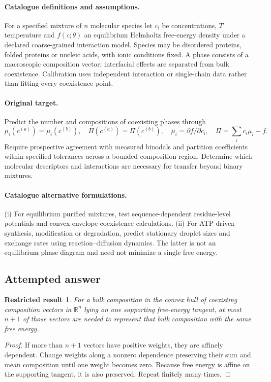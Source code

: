 \documentclass[11pt]{article}
\newcommand{\R}{\mathbb R}
\providecommand{\R}{\mathbb R}
\newtheorem{attemptresult}{Restricted result}[section]
\begin{document}
\paragraph{Catalogue definitions and assumptions.}
For a specified mixture of $n$ molecular species let $c_i$ be concentrations, $T$ temperature and $f(c;\theta)$ an equilibrium Helmholtz free-energy density under a declared coarse-grained interaction model. Species may be disordered proteins, folded proteins or nucleic acids, with ionic conditions fixed. A phase consists of a macroscopic composition vector; interfacial effects are separated from bulk coexistence. Calibration uses independent interaction or single-chain data rather than fitting every coexistence point.
\paragraph{Original target.}
Predict the number and compositions of coexisting phases through
\[\mu_i(c^{(a)})=\mu_i(c^{(b)}),\quad \Pi(c^{(a)})=\Pi(c^{(b)}),\quad \mu_i=\partial f/\partial c_i,\quad \Pi=\sum_i c_i\mu_i-f.\]
Require prospective agreement with measured binodals and partition coefficients within specified tolerances across a bounded composition region. Determine which molecular descriptors and interactions are necessary for transfer beyond binary mixtures.
\paragraph{Catalogue alternative formulations.}
(i) For equilibrium purified mixtures, test sequence-dependent residue-level potentials and convex-envelope coexistence calculations. (ii) For ATP-driven synthesis, modification or degradation, predict stationary droplet sizes and exchange rates using reaction--diffusion dynamics. The latter is not an equilibrium phase diagram and need not minimize a single free energy.
\subsection{Attempted answer}
\begin{attemptresult}
For a bulk composition in the convex hull of coexisting composition vectors in $\R^n$ lying on one supporting free-energy tangent, at most $n+1$ of those vectors are needed to represent that bulk composition with the same free energy.
\end{attemptresult}
\begin{proof}
If more than $n+1$ vectors have positive weights, they are affinely dependent. Change weights along a nonzero dependence preserving their sum and mean composition until one weight becomes zero. Because free energy is affine on the supporting tangent, it is also preserved. Repeat finitely many times.
\end{proof}
\end{document}
